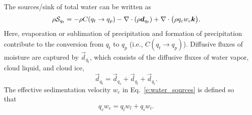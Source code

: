 \documentclass{report}
\begin{document}
The sources/sink of total water can be written as 
\begin{equation}\label{e:water_sources}
     \rho \mathcal{S}_{q_t} = - \rho C(q_t \rightarrow q_p) - \nabla \cdot (\rho \boldsymbol{{d}}_{q_t}) + \nabla \cdot \bigl(\rho q_c w_c \boldsymbol{{k}}  \bigr).
\end{equation}
Here, evaporation or sublimation of precipitation and formation of precipitation contribute to the conversion from $q_t$ to $q_p$ (i.e., $C(q_t \rightarrow q_p)$). Diffusive fluxes of moisture are captured by $\vec{d}_{q_t}$, which consists of the diffusive fluxes of water vapor, cloud liquid, and cloud ice, 
\begin{equation}
    \vec{d}_{q_t} =\vec{d}_{q_v} + \vec{d}_{q_l} + \vec{d}_{q_i}.
\end{equation}
The effective sedimentation velocity $w_c$ in Eq.~\eqref{e:water_sources} is defined so that 
\begin{equation}
    q_c w_c = q_l w_l + q_i w_i.
\end{equation}
\end{document}
